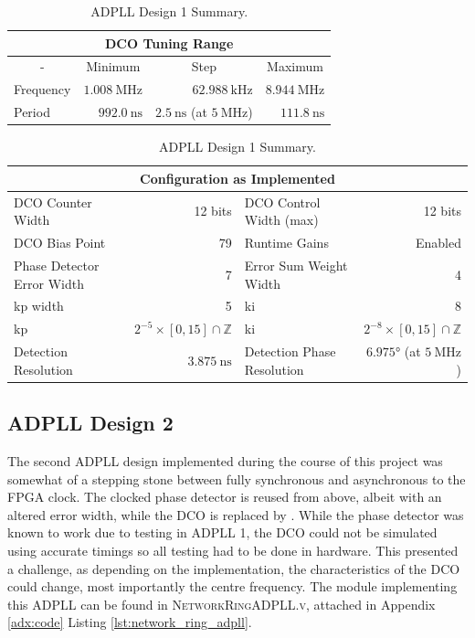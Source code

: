 \begin{table}[!h]
    \begin{center}
        \begin{tabular}{|l|r|r|r|}
            \multicolumn{4}{c}{\ac{DCO} Tuning Range} \T\\
            \hline
            \multicolumn{1}{|c|}{-} & \multicolumn{1}{c|}{Minimum} & \multicolumn{1}{c|}{Step} & \multicolumn{1}{c|}{Maximum} \T\\
            \hline
            Frequency & $1.008~\si{\mega\hertz}$ & \multicolumn{1}{r|}{$62.988~\si{\kilo\hertz}$} & $8.944~\si{\mega\hertz}$ \T\\
            \hline
            Period & $992.0~\si{\nano\second}$ & \multicolumn{1}{r|}{$2.5~\si{\nano\second}$ (at $5~\si{\mega\hertz}$)} & $111.8~\si{\nano\second}$ \T\\
            \hline
        \end{tabular}
        \begin{tabular}{|l|r|l|r|}
            \multicolumn{4}{c}{Configuration as Implemented} \T\\
            \hline
            \ac{DCO} Counter Width & 12 bits & \ac{DCO} Control Width (max) & 12 bits \T\\
            \hline
            \ac{DCO} Bias Point & 79 & Runtime Gains & Enabled \T\\
            \hline
            Phase Detector Error Width & 7 & Error Sum Weight Width & 4 \T\\
            \hline
            \acs{kp} width & 5 & \acs{ki} & 8 \T\\
            \hline
            \acs{kp} & $2^{-5}\times[0,15]\cap\mathbb{Z}$ & \acs{ki} & $2^{-8}\times[0,15]\cap\mathbb{Z}$ \T\\
            \hline
            Detection Resolution & $3.875~\si{\nano\second}$ & Detection Phase Resolution & $6.975\si{\degree}$ (at $5~\si{\mega\hertz}$)\\
            \hline
        \end{tabular}
    \end{center}
\caption[ADPLL Design 1 Summary]{ADPLL Design 1 Summary.}
\label{table:adpll1}
\end{table}

\subsection{\acs{ADPLL} Design 2}
The second \ac{ADPLL} design implemented during the course of this project was somewhat of a stepping stone between fully synchronous and asynchronous to the \ac{FPGA} clock. The clocked phase detector is reused from above, albeit with an altered error width, while the \ac{DCO} is replaced by . While the phase detector was known to work due to testing in \ac{ADPLL} 1, the \ac{DCO} could not be simulated using accurate timings so all testing had to be done in hardware. This presented a challenge, as depending on the implementation, the characteristics of the \ac{DCO} could change, most importantly the centre frequency. The module implementing this \ac{ADPLL} can be found in \textsc{NetworkRingADPLL.v}, attached in Appendix \ref{adx:code} Listing \ref{lst:network_ring_adpll}.

